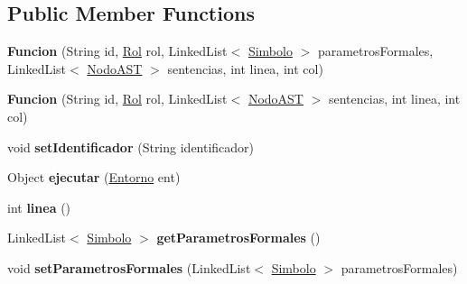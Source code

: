\subsection*{Public Member Functions}
\begin{DoxyCompactItemize}
\item 
\mbox{\label{classast_1_1instrucciones_1_1_funcion_aaabae2fd7dbd2317571610df212f4ec7}} 
{\bfseries Funcion} (String id, \mbox{\hyperlink{enumentorno_1_1_simbolo_1_1_rol}{Rol}} rol, Linked\+List$<$ \mbox{\hyperlink{classentorno_1_1_simbolo}{Simbolo}} $>$ parametros\+Formales, Linked\+List$<$ \mbox{\hyperlink{interfaceast_1_1_nodo_a_s_t}{Nodo\+A\+ST}} $>$ sentencias, int linea, int col)
\item 
\mbox{\label{classast_1_1instrucciones_1_1_funcion_ac3d6c8fe5070514662aabcc485032fba}} 
{\bfseries Funcion} (String id, \mbox{\hyperlink{enumentorno_1_1_simbolo_1_1_rol}{Rol}} rol, Linked\+List$<$ \mbox{\hyperlink{interfaceast_1_1_nodo_a_s_t}{Nodo\+A\+ST}} $>$ sentencias, int linea, int col)
\item 
\mbox{\label{classast_1_1instrucciones_1_1_funcion_a0097f4cae30c3e065ed15282fc851b0a}} 
void {\bfseries set\+Identificador} (String identificador)
\item 
\mbox{\label{classast_1_1instrucciones_1_1_funcion_a5861f1d779a87d0ac72deee25602b044}} 
Object {\bfseries ejecutar} (\mbox{\hyperlink{classentorno_1_1_entorno}{Entorno}} ent)
\item 
\mbox{\label{classast_1_1instrucciones_1_1_funcion_ada9350b49520c6c411d4479a08b90655}} 
int {\bfseries linea} ()
\item 
\mbox{\label{classast_1_1instrucciones_1_1_funcion_ab0aa9a20dcc240ec952556da7a3833f1}} 
Linked\+List$<$ \mbox{\hyperlink{classentorno_1_1_simbolo}{Simbolo}} $>$ {\bfseries get\+Parametros\+Formales} ()
\item 
\mbox{\label{classast_1_1instrucciones_1_1_funcion_a5ec7cbf4247459103a21d547a0980635}} 
void {\bfseries set\+Parametros\+Formales} (Linked\+List$<$ \mbox{\hyperlink{classentorno_1_1_simbolo}{Simbolo}} $>$ parametros\+Formales)

\end{DoxyCompactItemize}
